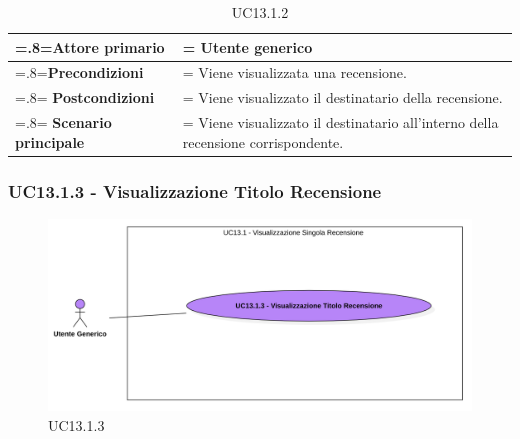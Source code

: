             \begin{table}[H]
                \centering
                \renewcommand{\arraystretch}{1.8}
                \renewcommand\tabularxcolumn[1]{m{#1}}
                \begin{tabularx}{0.9\textwidth} {
                    >{\hsize=.8\hsize\linewidth=\hsize}X
                    >{\hsize=1.2\hsize\linewidth=\hsize}X}
                    \hline
                    \textbf{Attore primario} & Utente generico \\
                    \hline
                    \textbf{Precondizioni} & Viene visualizzata una recensione. \\
                    \hline
                    \textbf{Postcondizioni} & Viene visualizzato il destinatario della recensione. \\
                    \hline
                    \textbf{Scenario principale} & Viene visualizzato il destinatario all'interno della recensione corrispondente. \\
                    \hline
                \end{tabularx}
                \caption{UC13.1.2}
            \end{table}

        \subsubsection{UC13.1.3 - Visualizzazione Titolo Recensione}
        \label{UC13.1.3}

            \begin{figure}[H]
                \centering
                \includegraphics[scale=0.6]{src/img/UC13.1.3.png}
                \caption{UC13.1.3}
            \end{figure}

